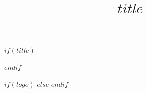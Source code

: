 $if(title)$
\title[$if(shorttitle)$$shorttitle$$else$$title$$endif$]{$title$}
$endif$

$if(logo)$
\def\journalLogo{$logo$}
$else$
\def\journalLogo{logo1.pdf}
$endif$

\def\keyFont{\fontsize{8}{11}\helveticabold }
\def\firstAuthorLast{$if(first-author-last)$$first-author-last$$else$$for(by-author)$
$if(it.name.family)$$it.name.family$$else$$it.name.literal$$endif$
$endfor$ \textit{et~al.}$endif$}

\def\Authors{$for(by-author)$$it.name.literal$\,$$^{$for(it.affiliations)$$it.number$$sep$,$endfor$$if(it.attributes.corresponding)$,*$endif$}$$%
$sep$, $endfor$}

\def\Address{$for(by-affiliation)$$$^{$it.number$}$$ $it.name$$if(it.department)$, $it.department$$endif$$if(it.city)$, $it.city$$endif$$if(it.country)$, $it.country$$endif$$sep$ \\ $endfor$}

\def\corrAuthor{$for(by-author)$$if(it.attributes.corresponding)$$it.name.literal$$endif$$endfor$}

\def\corrEmail{$for(by-author)$$if(it.attributes.corresponding)$$it.email$$endif$$endfor$}

